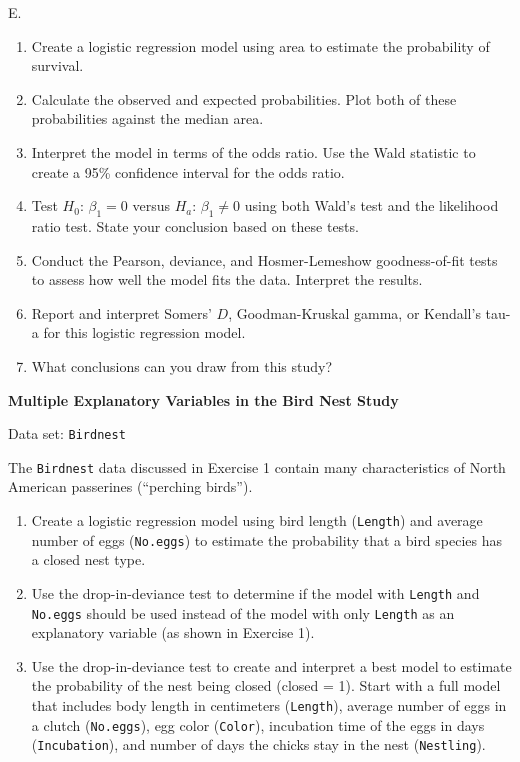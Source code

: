 \documentclass[
]{report}
\newcounter{excount}
\renewcommand{\theexcount}{E\arabic{excount}}
\begin{document}
\begin{list}{\theexcount.}{ \setlength{\itemsep}{1.2em}}
  \begin{enumerate}
    \item Create a logistic regression model using area to estimate the probability of survival.
    \item Calculate the observed and expected probabilities. Plot both of these probabilities against the median area.
    \item Interpret the model in terms of the odds ratio. Use the Wald statistic to create a 95\% confidence interval for the odds ratio.
    \item Test $H_0$: $\beta_1 = 0$ versus $H_a$: $\beta_1 \ne 0$ using both Wald’s test and the likelihood ratio test. State your conclusion based on these tests.
    \item Conduct the Pearson, deviance, and Hosmer-Lemeshow goodness-of-fit tests to assess how well the model fits the data. Interpret the results.
    \item Report and interpret Somers’ $D$, Goodman-Kruskal gamma, or Kendall’s tau-a for this logistic regression model.
    \item What conclusions can you draw from this study?
  \end{enumerate}

  \item \textbf{Multiple Explanatory Variables in the Bird Nest Study}

Data set: \texttt{Birdnest}

The \texttt{Birdnest} data discussed in Exercise 1 contain many characteristics of North American passerines (“perching birds”).

  \begin{enumerate}
    \item Create a logistic regression model using bird length (\texttt{Length}) and average number of eggs (\texttt{No.eggs}) to estimate the probability that a bird species has a closed nest type.
    \item Use the drop-in-deviance test to determine if the model with \texttt{Length} and \texttt{No.eggs} should be used instead of the model with only \texttt{Length} as an explanatory variable (as shown in Exercise 1).
    \item Use the drop-in-deviance test to create and interpret a best model to estimate the probability of the nest being closed (closed = 1). Start with a full model that includes body length in centimeters (\texttt{Length}), average number of eggs in a clutch (\texttt{No.eggs}), egg color (\texttt{Color}), incubation time of the eggs in days (\texttt{Incubation}), and number of days the chicks stay in the nest (\texttt{Nestling}).
  \end{enumerate}


\end{list}
\end{document}
